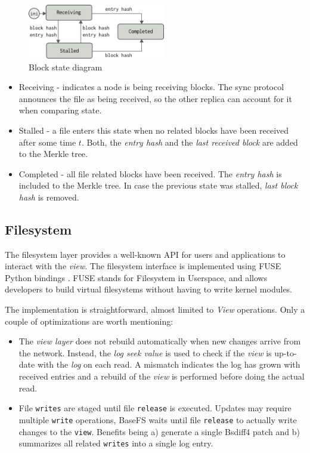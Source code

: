 \documentclass{sig-alternate}
\begin{document}
\begin{figure}
\centering
\includegraphics[width=170pt]{imgs/blockstate.png}
\caption{Block state diagram}
\label{fig:blockstate}
\end{figure}


\begin{itemize}
\item Receiving - indicates a node is being receiving blocks. The sync protocol announces the file as being received, so the other replica can account for it when comparing state.
\item Stalled - a file enters this state when no related blocks have been received after some time $t$. Both, the \textit{entry hash} and the \textit{last received block} are added to the Merkle tree.
\item Completed - all file related blocks have been received. The \textit{entry hash} is included to the Merkle tree. In case the previous state was stalled, \textit{last block hash} is removed.
\end{itemize}


\subsection{Filesystem}\label{filesystem}
The filesystem layer provides a well-known API for users and applications to interact with the \textit{view}. The filesystem interface is implemented using FUSE Python bindings \cite{fusepy}. FUSE stands for Filesystem in Userspace, and allows developers to build virtual filesystems without having to write kernel modules.

The implementation is straightforward, almost limited to \textit{View} operations. Only a couple of optimizations are worth mentioning:

\begin{itemize}
 \item The \textit{view layer} does not rebuild automatically when new changes arrive from the network. Instead, the \textit{log seek value} is used to check if the \textit{view} is up-to-date with the \textit{log} on each read. A mismatch indicates the log has grown with received entries and a rebuild of the \textit{view} is performed before doing the actual read.
 \item File \texttt{writes} are staged until file \texttt{release} is executed. Updates may require multiple \texttt{write} operations, BaseFS waits until file \texttt{release} to actually write changes to the \texttt{view}. Benefits being a) generate a single Bsdiff4 patch and b) summarizes all related \texttt{writes} into a single log entry.
\end{itemize}
\end{document}
